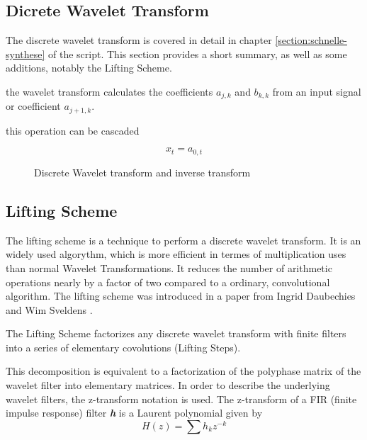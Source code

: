 \begin{refsection}
\section{Dicrete Wavelet Transform}

The discrete wavelet transform is covered in detail in chapter \ref{section:schnelle-synthese} of the script.
This section provides a short summary, as well as some additions, notably the Lifting Scheme.


the wavelet transform calculates the coefficients $a_{j,k}$ and $b_{k,k}$ from an input signal or coefficient $a_{j+1,k}$.

this operation can be cascaded



\begin{equation}
	x_t = a_{0,t}
\end{equation}

\begin{figure}
	\centering
	
	\caption{Discrete Wavelet transform and inverse transform}
\end{figure}


\subsection{Lifting Scheme}

The lifting scheme is a technique to perform a discrete wavelet transform.
It is an widely used algorythm, which is more efficient in termes of multiplication uses than normal Wavelet Transformations.
It reduces the number of arithmetic operations nearly by a factor of two compared to a ordinary, convolutional algorithm. %
The lifting scheme was introduced in a paper from Ingrid Daubechies and Wim Sveldens \cite{fpga:Daubechies1998}. 

The Lifting Scheme factorizes any discrete wavelet transform with finite filters into a series of elementary covolutions (Lifting Steps).

This decomposition is equivalent to a factorization of the polyphase matrix of the wavelet filter into elementary matrices. 
In order to describe the underlying wavelet filters, the z-transform notation is used.
The z-transform of a FIR (finite impulse response) filter \textit{\textbf{h}} is a Laurent polynomial given by
\begin{equation}\label{equ:impulse}
	H(z) = \sum h_k z^{-k}
\end{equation}



\end{refsection}
